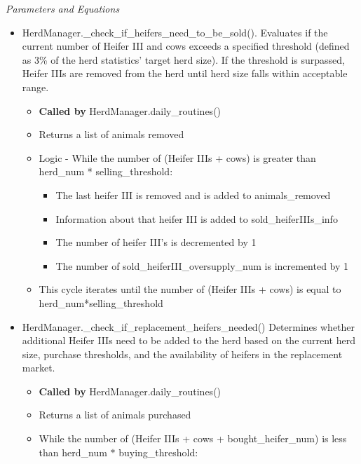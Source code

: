 \begin{refsection}
\begin{itemize}
         \end{itemize}

         \textit{Parameters and Equations}
         \vspace{0.1cm}

         \begin{itemize}
             \item HerdManager.\_check\_if\_heifers\_need\_to\_be\_sold(). Evaluates if the current number of Heifer III and cows exceeds a specified threshold (defined as 3\% of the herd statistics’ target herd size). If the threshold is surpassed, Heifer IIIs are removed from the herd until herd size falls within acceptable range. 
            \begin{itemize}
                \item \textbf{Called by} HerdManager.daily\_routines()
                \item Returns a list of animals removed 
                \item Logic - While the number of (Heifer IIIs + cows) is greater than herd\_num * selling\_threshold: 
                \begin{itemize}
                    \item The last heifer III is removed and is added to animals\_removed 
                    \item Information about that heifer III is added to sold\_heiferIIIs\_info 
                    \item The number of heifer III’s is decremented by 1 
                    \item The number of sold\_heiferIII\_oversupply\_num is incremented by 1 
                \end{itemize}
                \item This cycle iterates until the number of (Heifer IIIs + cows) is equal to herd\_num*selling\_threshold 
            \end{itemize}
            \item HerdManager.\_check\_if\_replacement\_heifers\_needed() Determines whether additional Heifer IIIs need to be added to the herd based on the current herd size, purchase thresholds, and the availability of heifers in the replacement market.
            \begin{itemize}
                \item \textbf{Called by} HerdManager.daily\_routines()
                \item Returns a list of animals purchased 
                \item While the number of (Heifer IIIs + cows + bought\_heifer\_num) is less than herd\_num \( * \) buying\_threshold: 

\end{itemize}
\end{itemize}
\end{refsection}
